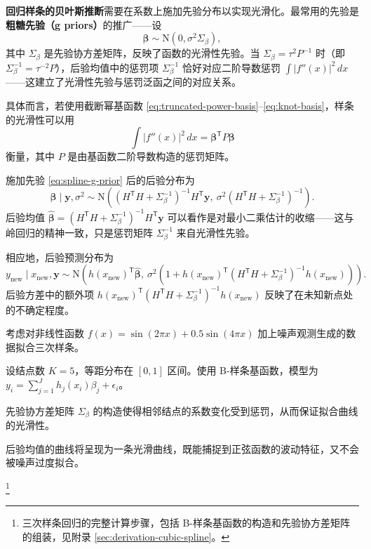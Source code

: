 \textbf{回归样条的贝叶斯推断}需要在系数上施加先验分布以实现光滑化。最常用的先验是\textbf{粗糖先验（g priors）}的推广——设
\begin{equation}
\boldsymbol{\beta} \sim \mathrm{N}(0, \sigma^2 \Sigma_\beta),
\label{eq:spline-g-prior}
\end{equation}
其中 $\Sigma_\beta$ 是先验协方差矩阵，反映了函数的光滑性先验。当 $\Sigma_\beta = \tau^2 P^{-1}$ 时（即 $\Sigma_\beta^{-1} = \tau^{-2} P$），后验均值中的惩罚项 $\Sigma_\beta^{-1}$ 恰好对应二阶导数惩罚 $\int |f''(x)|^2\, dx$——这建立了光滑性先验与惩罚泛函之间的对应关系。

具体而言，若使用截断幂基函数 \eqref{eq:truncated-power-basis}--\eqref{eq:knot-basis}，样条的光滑性可以用
\begin{equation}
\int |f''(x)|^2\, dx = \boldsymbol{\beta}^{\mathsf{T}} P \boldsymbol{\beta}
\label{eq:spline-roughness-penalty}
\end{equation}
衡量，其中 $P$ 是由基函数二阶导数构造的惩罚矩阵。

施加先验 \eqref{eq:spline-g-prior} 后的后验分布为
\begin{equation}
\boldsymbol{\beta} \mid \mathbf{y}, \sigma^2 \sim \mathrm{N}\left((H^{\mathsf{T}} H + \Sigma_\beta^{-1})^{-1} H^{\mathsf{T}} \mathbf{y},\ \sigma^2 (H^{\mathsf{T}} H + \Sigma_\beta^{-1})^{-1}\right).
\label{eq:spline-posterior}
\end{equation}
后验均值 $\hat{\boldsymbol{\beta}} = (H^{\mathsf{T}} H + \Sigma_\beta^{-1})^{-1} H^{\mathsf{T}} \mathbf{y}$ 可以看作是对最小二乘估计的收缩——这与岭回归的精神一致，只是惩罚矩阵 $\Sigma_\beta^{-1}$ 来自光滑性先验。

相应地，后验预测分布为
\begin{equation}
y_{\mathrm{new}} \mid x_{\mathrm{new}}, \mathbf{y} \sim \mathrm{N}\left(h(x_{\mathrm{new}})^{\mathsf{T}} \hat{\boldsymbol{\beta}},\ \sigma^2 \left(1 + h(x_{\mathrm{new}})^{\mathsf{T}} (H^{\mathsf{T}} H + \Sigma_\beta^{-1})^{-1} h(x_{\mathrm{new}})\right)\right).
\label{eq:spline-posterior-predictive}
\end{equation}
后验方差中的额外项 $h(x_{\mathrm{new}})^{\mathsf{T}} (H^{\mathsf{T}} H + \Sigma_\beta^{-1})^{-1} h(x_{\mathrm{new}})$ 反映了在未知新点处的不确定程度。

\begin{Example}[三次样条回归]\label{ex:cubic-spline-example}
考虑对非线性函数 $f(x) = \sin(2\pi x) + 0.5 \sin(4\pi x)$ 加上噪声观测生成的数据拟合三次样条。

设结点数 $K = 5$，等距分布在 $[0, 1]$ 区间。使用 B-样条基函数，模型为 $y_i = \sum_{j=1}^{J} h_j(x_i) \beta_j + \epsilon_i$。

先验协方差矩阵 $\Sigma_\beta$ 的构造使得相邻结点的系数变化受到惩罚，从而保证拟合曲线的光滑性。

后验均值的曲线将呈现为一条光滑曲线，既能捕捉到正弦函数的波动特征，又不会被噪声过度拟合。
\end{Example}
\footnote{三次样条回归的完整计算步骤，包括 B-样条基函数的构造和先验协方差矩阵的组装，见附录 \cref{sec:derivation-cubic-spline}。}

